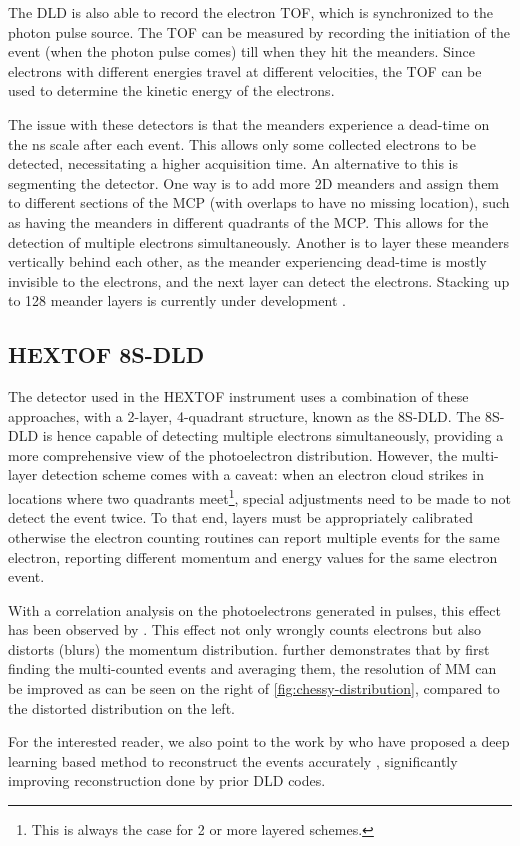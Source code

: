 The \gls{DLD} is also able to record the electron \gls{TOF}, which is synchronized to the photon pulse source. The \gls{TOF} can be measured by recording the initiation of the event (when the photon pulse comes) till when they hit the meanders. Since electrons with different energies travel at different velocities, the \gls{TOF} can be used to determine the kinetic energy of the electrons.

The issue with these detectors is that the meanders experience a dead-time on the \unit{ns} scale after each event. This allows only some collected electrons to be detected, necessitating a higher acquisition time. An alternative to this is segmenting the detector. One way is to add more 2D meanders and assign them to different sections of the \gls{MCP} (with overlaps to have no missing location), such as having the meanders in different quadrants of the \gls{MCP}. This allows for the detection of multiple electrons simultaneously. Another is to layer these meanders vertically behind each other, as the meander experiencing dead-time is mostly invisible to the electrons, and the next layer can detect the electrons. Stacking up to \num{128} meander layers is currently under development \cite{oelsnerTimeEnergyResolved2010}.

\subsection{HEXTOF 8S-DLD}\label{section:8s-dld}
The detector used in the \gls{HEXTOF} instrument uses a combination of these approaches, with a 2-layer, 4-quadrant structure, known as the 8S-DLD. The 8S-DLD is hence capable of detecting multiple electrons simultaneously, providing a more comprehensive view of the photoelectron distribution. However, the multi-layer detection scheme comes with a caveat: when an electron cloud strikes in locations where two quadrants meet\footnote{This is always the case for 2 or more layered schemes.}, special adjustments need to be made to not detect the event twice. To that end, layers must be appropriately calibrated otherwise the electron counting routines can report multiple events for the same electron, reporting different momentum and energy values for the same electron event. 

With a correlation analysis on the photoelectrons generated in pulses, this effect has been observed by \citeauthor{heberStudiesUltrafastDynamics2024} \cite{heberStudiesUltrafastDynamics2024}. This effect not only wrongly counts electrons but also distorts (blurs) the momentum distribution. \citeauthor{heberStudiesUltrafastDynamics2024} further demonstrates that by first finding the multi-counted events and averaging them, the resolution of \gls{MM} can be improved as can be seen on the right of \cref{fig:chessy-distribution}, compared to the distorted distribution on the left.

For the interested reader, we also point to the work by \citeauthor{knipferDeepLearningbasedSpatiotemporal2024} who have proposed a deep learning based method to reconstruct the events accurately \cite{knipferDeepLearningbasedSpatiotemporal2024}, significantly improving reconstruction done by prior \gls{DLD} codes.
